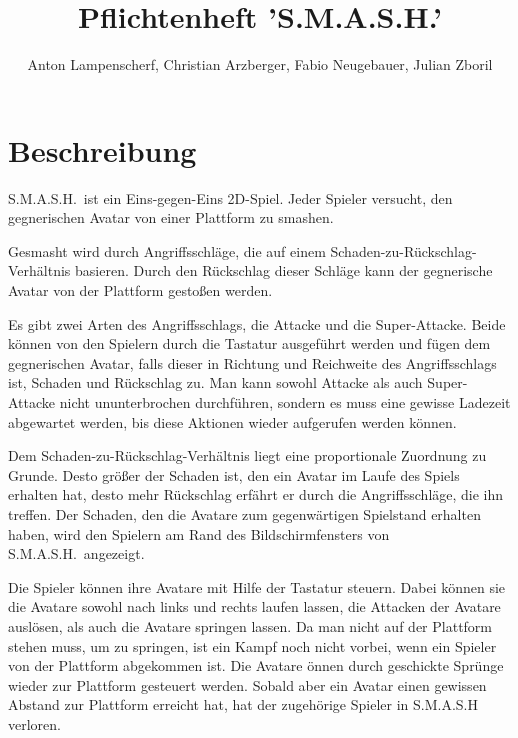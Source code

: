 \documentclass[11pt]{article}
\title{Pflichtenheft 'S.M.A.S.H.'}
\author{Anton Lampenscherf, Christian Arzberger, Fabio Neugebauer, Julian Zboril}
\newcommand{\paragraphspace}{0.3cm}
\begin{document}
    \maketitle

    \section{Beschreibung}\label{sec:beschreibung}
    S.M.A.S.H.\ ist ein Eins-gegen-Eins 2D-Spiel.
    Jeder Spieler versucht, den gegnerischen Avatar von einer Plattform zu \glqq smashen\grqq{}.
    \vspace{\paragraphspace}

    \noindent
    Gesmasht wird durch Angriffsschl\"age, die auf einem Schaden-zu-R\"uckschlag-Verh\"altnis basieren.
    Durch den R\"uckschlag dieser Schl\"age kann der gegnerische Avatar von der Plattform gesto\ss{}en werden.
    \vspace{\paragraphspace}

    \noindent
    Es gibt zwei Arten des Angriffsschlags, die Attacke und die Super-Attacke.
    Beide k\"onnen von den Spielern durch die Tastatur ausgef\"uhrt werden und f\"ugen dem gegnerischen Avatar, falls dieser in Richtung und Reichweite des Angriffsschlags ist, Schaden und R\"uckschlag zu. Man kann sowohl Attacke als auch Super-Attacke nicht ununterbrochen durchf\"uhren, sondern es muss eine gewisse Ladezeit abgewartet werden, bis diese Aktionen wieder aufgerufen werden k\"onnen.
    \vspace{\paragraphspace}

    \noindent
    Dem Schaden-zu-R\"uckschlag-Verh\"altnis liegt eine proportionale Zuordnung zu Grunde.
    Desto gr\"o\ss{}er der Schaden ist, den ein Avatar im Laufe des Spiels erhalten hat, desto mehr R\"uckschlag erf\"ahrt er durch die Angriffsschl\"age, die ihn treffen.
    Der Schaden, den die Avatare zum gegenw\"artigen Spielstand erhalten haben, wird den Spielern am Rand des Bildschirmfensters von S.M.A.S.H.\ angezeigt.
    \vspace{\paragraphspace}

    \noindent
    Die Spieler k\"onnen ihre Avatare mit Hilfe der Tastatur steuern.
    Dabei k\"onnen sie die Avatare sowohl nach links und rechts laufen lassen, die Attacken der Avatare ausl\"osen, als auch die Avatare springen lassen.
    Da man nicht auf der Plattform stehen muss, um zu springen, ist ein Kampf noch nicht vorbei, wenn ein Spieler von der Plattform abgekommen ist.
    Die Avatare \"onnen durch geschickte Spr\"unge wieder zur Plattform gesteuert werden.
    Sobald aber ein Avatar einen gewissen Abstand zur Plattform erreicht hat, hat der zugeh\"orige Spieler in S.M.A.S.H verloren.
    \vspace{\paragraphspace}
\end{document}
